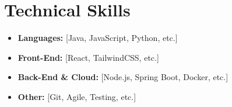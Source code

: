 \documentclass[letterpaper,11pt]{article}
\newcommand{\resumeItem}[1]{\item\small{#1 \vspace{-2pt}}}
\newcommand{\resumeItemListStart}{\begin{itemize}}
\newcommand{\resumeItemListEnd}{\end{itemize}\vspace{-5pt}}
\begin{document}
\section{Technical Skills}
  \resumeItemListStart
    \resumeItem{\textbf{Languages:} [Java, JavaScript, Python, etc.]}
    \resumeItem{\textbf{Front-End:} [React, TailwindCSS, etc.]}
    \resumeItem{\textbf{Back-End \& Cloud:} [Node.js, Spring Boot, Docker, etc.]}
    \resumeItem{\textbf{Other:} [Git, Agile, Testing, etc.]}
  \resumeItemListEnd

\end{document}
